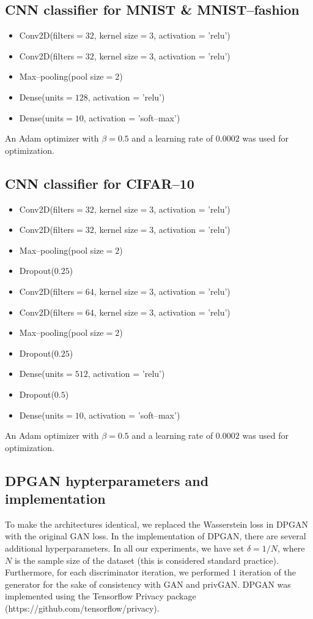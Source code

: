 \documentclass{article}
\begin{document}
\subsection*{CNN classifier for MNIST \& MNIST--fashion}
\begin{itemize}
\itemsep0em
    \item Conv2D(filters$= 32$, kernel size$=3$, activation = 'relu')
    \item Conv2D(filters$= 32$, kernel size$=3$, activation = 'relu')
    \item Max--pooling(pool size$=2$)
    \item Dense(units$= 128$, activation = 'relu')
    \item Dense(units$= 10$, activation = 'soft--max')
\end{itemize}
An Adam optimizer with $\beta = 0.5$ and a learning rate of $0.0002$ was used for optimization.

\subsection*{CNN classifier for CIFAR--10}
\begin{itemize}
\itemsep0em
    \item Conv2D(filters$= 32$, kernel size$=3$, activation = 'relu')
    \item Conv2D(filters$= 32$, kernel size$=3$, activation = 'relu')
    \item Max--pooling(pool size$=2$)
    \item Dropout($0.25$)
    \item Conv2D(filters$= 64$, kernel size$=3$, activation = 'relu')
    \item Conv2D(filters$= 64$, kernel size$=3$, activation = 'relu')
    \item Max--pooling(pool size$=2$)
    \item Dropout($0.25$)
    \item Dense(units$= 512$, activation = 'relu')
    \item Dropout($0.5$)
    \item Dense(units$= 10$, activation = 'soft--max')
\end{itemize}
An Adam optimizer with $\beta = 0.5$ and a learning rate of $0.0002$ was used for optimization.

\subsection*{DPGAN hypterparameters and implementation}
To make the architectures identical, we replaced the Wasserstein loss in DPGAN with the original GAN loss. In the implementation of DPGAN, there are several additional hyperparameters. In all our experiments, we have set  $\delta = 1/N$, where $N$ is the sample size of the dataset (this is considered standard practice). Furthermore, for each discriminator iteration, we performed $1$ iteration of the generator for the sake of consistency with GAN and privGAN. DPGAN was implemented using the Tensorflow Privacy package (https://github.com/tensorflow/privacy).  
\end{document}
